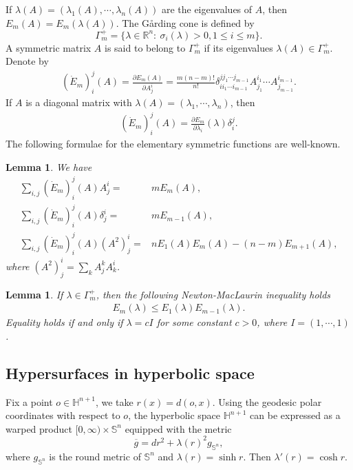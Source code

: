 \documentclass[11pt,reqno]{amsart}
\newtheorem{lem}[thm]{Lemma}
\theoremstyle{definition}
\theoremstyle{remark}
\numberwithin{equation}{section}
\renewcommand{\(}{\left(}
\renewcommand{\)}{\right)}
\renewcommand{\~}{\widetilde}
\renewcommand{\-}{\overline}
\renewcommand{\d}{\delta}
\renewcommand{\l}{\lambda}
\newcommand{\s}{\sigma}
\newcommand{\G}{\Gamma}
\renewcommand{\l}{\lambda}
\begin{document}
If $\l(A)=(\l_1(A),\cdots,\l_n(A))$ are the eigenvalues of $A$, then $E_m(A)=E_m(\l(A))$. The G{\aa}rding cone is defined by
$$
\G_m^+=\{\l\in \mathbb R^n:~\s_i(\l)>0,1\leq i\leq m\}.
$$
A symmetric matrix $A$ is said to belong to $\G_m^+$ if its eigenvalues $\l(A)\in \G_m^{+}$. Denote by
\begin{align*}
(\dot{E}_{m})_i^j(A)=\frac{\partial E_m(A)}{\partial A_j^i}=\frac{m(n-m)!}{n!}\d_{i i_1\cdots i_{m-1}}^{j j_1\cdots j_{m-1}} A_{j_1}^{i_1}\cdots A_{j_{m-1}}^{i_{m-1}}.
\end{align*}
If $A$ is a diagonal matrix with $\l(A)=(\l_1,\cdots,\l_n)$, then
\begin{align*}
(\dot{E}_{m})_i^j(A)=\frac{\partial E_m}{\partial \l_i}(\l) \d_i^j.
\end{align*}
The following formulae for the elementary symmetric functions are  well-known.
\begin{lem}\cite{Hardy-Littlewood-Polya1934,Reilly1973}
	We have
	\begin{align}
	\sum_{i,j}(\dot{E}_m)_i^j(A) A_j^i=&m E_m(A),\label{s2:id-1}\\
	\sum_{i,j}(\dot{E}_m)_i^j(A) \d_j^i=&m E_{m-1}(A), \label{s2:id-2}\\
	\sum_{i,j}(\dot{E}_m)_i^j(A) (A^2)_j^i=& n E_1(A)E_m(A)-(n-m)E_{m+1}(A),\label{s2:id-3}
	\end{align}
	where $(A^2)_j^i=\sum_{k}A_j^kA_k^i$.
\end{lem}


\begin{lem}\cite[Lemma 2.5]{Guan14}
	If $\l\in \G_{m}^+$, then the following Newton-MacLaurin inequality holds
	\begin{align}\label{s2:NM-ineq-1}
	E_m(\l) \leq E_1(\l)E_{m-1}(\l). 
	\end{align}
	Equality holds if and only if $\l=cI$ for some constant $c>0$, where $I=(1,\cdots,1)$.
\end{lem}

\subsection{Hypersurfaces in hyperbolic space}

Fix a point $o\in \mathbb H^{n+1}$, we take $r(x)=d(o,x)$. Using the geodesic polar coordinates with respect to $o$, the hyperbolic space $\mathbb H^{n+1}$ can be expressed as a warped product $[0,\infty)\times \mathbb S^n$ equipped with the metric
\begin{equation*}
  \-g=dr^2+\l(r)^2 g_{\mathbb S^n},
\end{equation*}
 where $g_{\mathbb S^n}$ is the round metric of $\mathbb S^n$ and $\l(r)=\sinh r$. Then $\l'(r)=\cosh r$.
\end{document}
